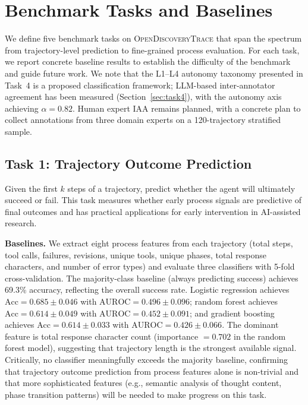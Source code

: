 \documentclass{article}
\newcommand{\dataset}{\textsc{OpenDiscoveryTrace}\xspace}
\begin{document}
\section{Benchmark Tasks and Baselines}
\label{sec:benchmarks}

We define five benchmark tasks on \dataset that span the spectrum from trajectory-level prediction to fine-grained process evaluation. For each task, we report concrete baseline results to establish the difficulty of the benchmark and guide future work. We note that the L1--L4 autonomy taxonomy presented in Task~4 is a proposed classification framework; LLM-based inter-annotator agreement has been measured (Section~\ref{sec:task4}), with the autonomy axis achieving $\alpha=0.82$. Human expert IAA remains planned, with a concrete plan to collect annotations from three domain experts on a 120-trajectory stratified sample.

\subsection{Task 1: Trajectory Outcome Prediction}
\label{sec:task1}

Given the first $k$ steps of a trajectory, predict whether the agent will ultimately succeed or fail. This task measures whether early process signals are predictive of final outcomes and has practical applications for early intervention in AI-assisted research.

\textbf{Baselines.} We extract eight process features from each trajectory (total steps, tool calls, failures, revisions, unique tools, unique phases, total response characters, and number of error types) and evaluate three classifiers with 5-fold cross-validation. The majority-class baseline (always predicting success) achieves 69.3\% accuracy, reflecting the overall success rate. Logistic regression achieves $\text{Acc}=0.685 \pm 0.046$ with $\text{AUROC}=0.496 \pm 0.096$; random forest achieves $\text{Acc}=0.614 \pm 0.049$ with $\text{AUROC}=0.452 \pm 0.091$; and gradient boosting achieves $\text{Acc}=0.614 \pm 0.033$ with $\text{AUROC}=0.426 \pm 0.066$. The dominant feature is total response character count (importance $= 0.702$ in the random forest model), suggesting that trajectory length is the strongest available signal. Critically, no classifier meaningfully exceeds the majority baseline, confirming that trajectory outcome prediction from process features alone is non-trivial and that more sophisticated features (e.g., semantic analysis of thought content, phase transition patterns) will be needed to make progress on this task.
\end{document}
